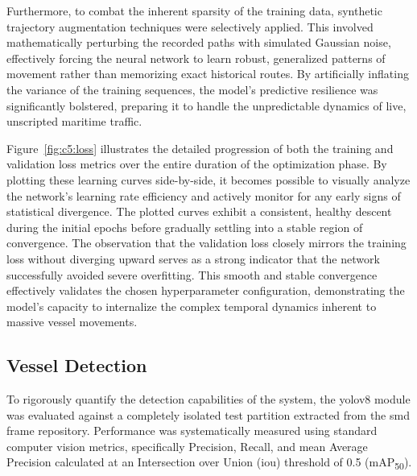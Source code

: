 Furthermore, to combat the inherent sparsity of the training data, synthetic trajectory augmentation techniques were selectively applied. This involved mathematically perturbing the recorded paths with simulated Gaussian noise, effectively forcing the neural network to learn robust, generalized patterns of movement rather than memorizing exact historical routes. By artificially inflating the variance of the training sequences, the model's predictive resilience was significantly bolstered, preparing it to handle the unpredictable dynamics of live, unscripted maritime traffic.

\begin{reportfigblock}
Figure~\ref{fig:c5:loss} illustrates the detailed progression of both the training and validation loss metrics over the entire duration of the optimization phase. By plotting these learning curves side-by-side, it becomes possible to visually analyze the network's learning rate efficiency and actively monitor for any early signs of statistical divergence.
The plotted curves exhibit a consistent, healthy descent during the initial epochs before gradually settling into a stable region of convergence. The observation that the validation loss closely mirrors the training loss without diverging upward serves as a strong indicator that the network successfully avoided severe overfitting. This smooth and stable convergence effectively validates the chosen hyperparameter configuration, demonstrating the model's capacity to internalize the complex temporal dynamics inherent to massive vessel movements.
\end{reportfigblock}

\subsection{Vessel Detection}

To rigorously quantify the detection capabilities of the system, the \gls{yolov8} module was evaluated against a completely isolated test partition extracted from the \gls{smd} frame repository. Performance was systematically measured using standard computer vision metrics, specifically Precision, Recall, and mean Average Precision calculated at an Intersection over Union (\gls{iou}) threshold of 0.5 (mAP\textsubscript{50}). 

